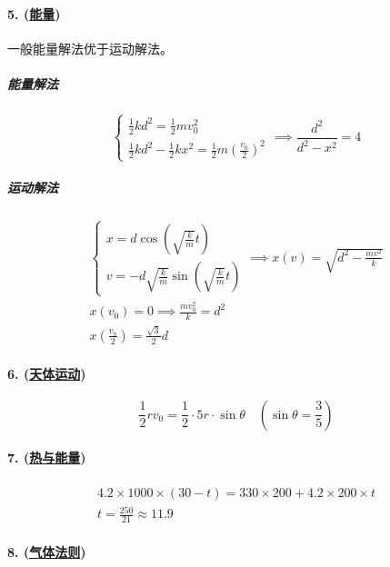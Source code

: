 \paragraph{5. (\hyperref[subsec:能量]{能量})} 一般能量解法优于运动解法。

\subparagraph{能量解法}

\begin{equation*}
    \begin{cases}
        \frac12kd^2=\frac12mv_0^2\\
        \frac12kd^2-\frac12kx^2=\frac12m\left(\frac{v_0}{2}\right)^2
    \end{cases}\implies
    \frac{d^2}{d^2-x^2}=4
\end{equation*}

\subparagraph{运动解法}

\begin{gather*}
    \begin{cases}
        x=d\cos\left(\sqrt{\frac{k}{m}}t\right)\\
        v=-d\sqrt{\frac{k}{m}}\sin\left(\sqrt{\frac{k}{m}}t\right)
    \end{cases}\implies
    x(v)=\sqrt{d^2-\frac{mv^2}{k}}\\
    x(v_0)=0\implies \frac{mv_0^2}{k}=d^2\\
    x\left(\frac{v_0}{2}\right)=\frac{\sqrt{3}}{2}d
\end{gather*}

\paragraph{6. (\hyperref[subsec:天体运动]{天体运动})}

\begin{equation*}
    \frac12rv_0=\frac12\cdot5r\cdot\sin\theta\quad\left(\sin\theta=\frac35\right)
\end{equation*}

\paragraph{7. (\hyperref[sec:热与能量]{热与能量})}

\begin{gather*}
    4.2\times1000\times(30-t)=330\times200+4.2\times200\times t\\
    t=\frac{250}{21}\approx11.9
\end{gather*}

\paragraph{8. (\hyperref[subsec:气体法则]{气体法则})}

